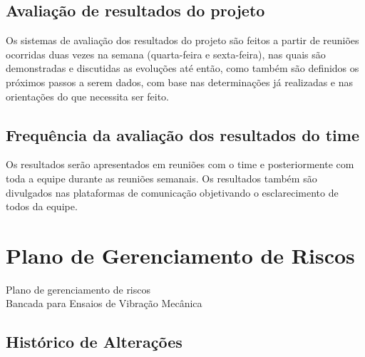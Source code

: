 \begin{apendicesenv}

\section*{Avaliação de resultados do projeto}
 Os sistemas de avaliação dos resultados do projeto são feitos a partir de reuniões ocorridas duas vezes na semana (quarta-feira e sexta-feira), nas quais são demonstradas e discutidas as evoluções até então, como também são definidos os próximos passos a serem dados, com base nas determinações já realizadas e nas orientações do que necessita ser feito.

\section*{Frequência da avaliação dos resultados do time}
Os resultados serão apresentados em reuniões com o time e posteriormente com toda a equipe durante as reuniões semanais. Os resultados também são divulgados nas plataformas de comunicação objetivando o esclarecimento de todos da equipe. 



\chapter{Plano de Gerenciamento de Riscos}
  	\label{plano_de_riscos}
% 	


\begin{center}
 {\large Plano de gerenciamento de riscos}\\[0.2cm]
 {Bancada para Ensaios de Vibração Mecânica}\\
 \end{center}
 
 \section*{Histórico de Alterações}
\begin{table}[h]
\centering
\begin{tabular}{|c|c|p{6cm}|p{5cm}|}


\end{tabular}
\end{table}
\end{apendicesenv}

